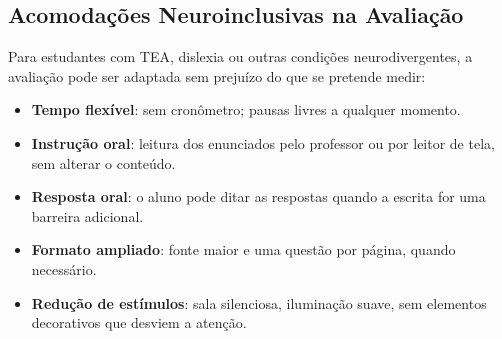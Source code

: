 \subsection{Acomodações Neuroinclusivas na Avaliação}

Para estudantes com TEA, dislexia ou outras condições neurodivergentes, a
avaliação pode ser adaptada sem prejuízo do que se pretende medir:

\begin{itemize}
  \item \textbf{Tempo flexível}: sem cronômetro; pausas livres a qualquer momento.
  \item \textbf{Instrução oral}: leitura dos enunciados pelo professor ou
        por leitor de tela, sem alterar o conteúdo.
  \item \textbf{Resposta oral}: o aluno pode ditar as respostas quando a
        escrita for uma barreira adicional.
  \item \textbf{Formato ampliado}: fonte maior e uma questão por página,
        quando necessário.
  \item \textbf{Redução de estímulos}: sala silenciosa, iluminação suave,
        sem elementos decorativos que desviem a atenção.
\end{itemize}

